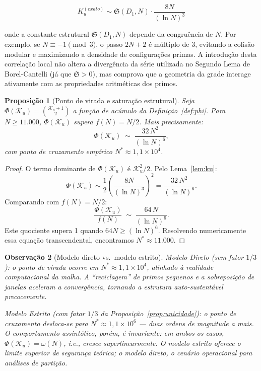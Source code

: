 \documentclass{article}
\newtheorem{proposition}{Proposição}[section]
\newtheorem{remark}[proposition]{Observação}
\begin{document}
	\begin{equation}
		K_u^{(exato)} \sim \mathfrak{S}(D_1, N) \cdot \frac{8N}{(\ln N)^3}
	\end{equation}
	
	onde a constante estrutural $\mathfrak{S}(D_1, N)$ depende da congruência de $N$. Por exemplo, se $N \equiv -1 \pmod 3$, o passo $2N+2$ é múltiplo de 3, evitando a colisão modular e maximizando a densidade de configurações primas. A introdução desta correlação local não altera a divergência da série utilizada no Segundo Lema de Borel-Cantelli (já que $\mathfrak{S} > 0$), mas comprova que a geometria da grade interage ativamente com as propriedades aritméticas dos primos.
	
	\begin{proposition}[Ponto de virada e saturação estrutural]
		\label{prop:virada}
		Seja $\Phi(\mathcal{K}_u) = \binom{\mathcal{K}_u+1}{2}$ a função
		de acúmulo da Definição~\ref{def:phi}. Para $N \geq 11.000$,
		$\Phi(\mathcal{K}_u)$ supera $f(N) = N/2$. Mais precisamente:
		\[
		\Phi(\mathcal{K}_u) \;\sim\; \frac{32\,N^2}{(\ln N)^6},
		\]
		com ponto de cruzamento empírico $N^* \approx 1{,}1 \times 10^4$.
	\end{proposition}
	
	\begin{proof}
		O termo dominante de $\Phi(\mathcal{K}_u)$ é
		$\mathcal{K}_u^2/2$. Pelo Lema~\ref{lem:ku}:
		\[
		\Phi(\mathcal{K}_u) \sim \frac{1}{2}
		\left(\frac{8N}{(\ln N)^3}\right)^2
		= \frac{32\,N^2}{(\ln N)^6}.
		\]
		Comparando com $f(N) = N/2$:
		\[
		\frac{\Phi(\mathcal{K}_u)}{f(N)}
		\;\sim\; \frac{64\,N}{(\ln N)^6}.
		\]
		Este quociente supera 1 quando $64N \geq (\ln N)^6$.
		Resolvendo numericamente essa equação transcendental,
		encontramos $N^* \approx 11.000$.
	\end{proof}
	
	\begin{remark}[Modelo direto vs.\ modelo estrito]
		\label{obs:modelos}
		\emph{Modelo Direto} (sem fator $1/3$): o ponto de virada
		ocorre em $N^* \approx 1{,}1 \times 10^4$, alinhado à
		realidade computacional da malha. A ``reciclagem'' de primos
		pequenos e a sobreposição de janelas aceleram a convergência,
		tornando a estrutura auto-sustentável precocemente.
		
		\emph{Modelo Estrito} (com fator $1/3$ da
		Proposição~\ref{prop:unicidade}): o ponto de cruzamento
		desloca-se para $N^* \approx 1{,}1 \times 10^6$ — duas ordens
		de magnitude a mais. O comportamento assintótico, porém, é
		invariante: em ambos os casos, $\Phi(\mathcal{K}_u) = \omega(N)$,
		i.e., cresce superlinearmente. O modelo estrito oferece o
		\emph{limite superior de segurança} teórica; o modelo direto,
		o \emph{cenário operacional} para análises de partição.
	\end{remark}
	
\end{document}
